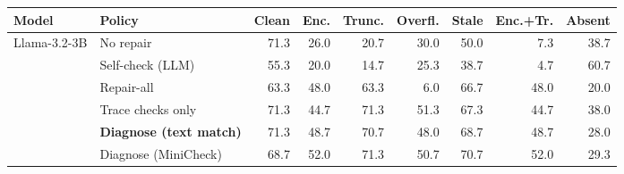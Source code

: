 \begin{tabular}{llrrrrrrr}
\toprule
Model & Policy & Clean & Enc. & Trunc. & Overfl. & Stale & Enc.+Tr. & Absent \\
\midrule
Llama-3.2-3B & No repair & 71.3 & 26.0 & 20.7 & 30.0 & 50.0 & 7.3 & 38.7 \\
 & Self-check (LLM) & 55.3 & 20.0 & 14.7 & 25.3 & 38.7 & 4.7 & 60.7 \\
 & Repair-all & 63.3 & 48.0 & 63.3 & 6.0 & 66.7 & 48.0 & 20.0 \\
 & Trace checks only & 71.3 & 44.7 & 71.3 & 51.3 & 67.3 & 44.7 & 38.0 \\
 & \textbf{Diagnose (text match)} & 71.3 & 48.7 & 70.7 & 48.0 & 68.7 & 48.7 & 28.0 \\
 & Diagnose (MiniCheck) & 68.7 & 52.0 & 71.3 & 50.7 & 70.7 & 52.0 & 29.3 \\
\bottomrule
\end{tabular}
